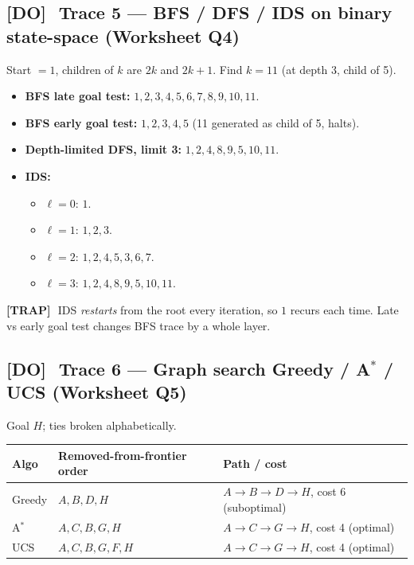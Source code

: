 \documentclass[11pt, a4paper]{article}
\newcommand{\thead}[1]{\textbf{#1}}
\newcommand{\trapflag}{\textcolor{trapBd}{\textbf{[TRAP]}}\,}
\newcommand{\doflag}{\textcolor{doBd}{\textbf{[DO]}}\,}
\begin{document}
\subsection{\doflag\ Trace 5 --- BFS / DFS / IDS on binary state-space (Worksheet Q4)}

Start $=1$, children of $k$ are $2k$ and $2k+1$. Find $k=11$ (at depth 3, child of 5).

\begin{itemize}
  \item \textbf{BFS late goal test:} $1, 2, 3, 4, 5, 6, 7, 8, 9, 10, 11$.
  \item \textbf{BFS early goal test:} $1, 2, 3, 4, 5$ (11 generated as child of 5, halts).
  \item \textbf{Depth-limited DFS, limit 3:} $1, 2, 4, 8, 9, 5, 10, 11$.
  \item \textbf{IDS:}
    \begin{itemize}
      \item $\ell=0$: $1$.
      \item $\ell=1$: $1, 2, 3$.
      \item $\ell=2$: $1, 2, 4, 5, 3, 6, 7$.
      \item $\ell=3$: $1, 2, 4, 8, 9, 5, 10, 11$.
    \end{itemize}
\end{itemize}

\trapflag\ IDS \emph{restarts} from the root every iteration, so $1$ recurs each time. Late vs early goal test changes BFS trace by a whole layer.

\subsection{\doflag\ Trace 6 --- Graph search Greedy / A$^{*}$ / UCS (Worksheet Q5)}

Goal $H$; ties broken alphabetically.

\begin{center}
\renewcommand{\arraystretch}{1.15}
\begin{tabularx}{\textwidth}{@{}lXl@{}}
\toprule
\thead{Algo} & \thead{Removed-from-frontier order} & \thead{Path / cost} \\
\midrule
Greedy & $A, B, D, H$ & $A{\to}B{\to}D{\to}H$, cost 6 (suboptimal) \\
A$^{*}$ & $A, C, B, G, H$ & $A{\to}C{\to}G{\to}H$, cost 4 (optimal) \\
UCS & $A, C, B, G, F, H$ & $A{\to}C{\to}G{\to}H$, cost 4 (optimal) \\
\bottomrule
\end{tabularx}
\end{center}
\end{document}
